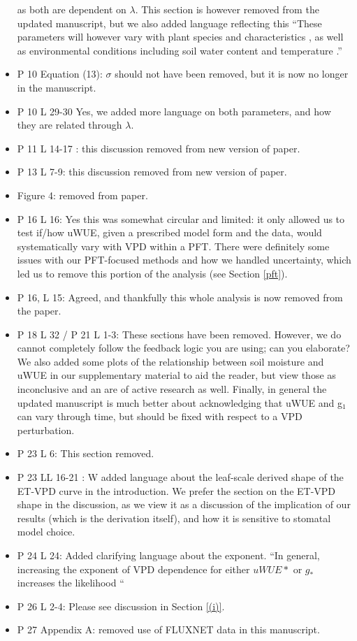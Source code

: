 \documentclass[12pt]{article}
\begin{document}
\begin{itemize}
  as both are dependent on $\lambda$. This section is however removed
  from the updated manuscript, but we also added language reflecting
  this ``These parameters will however vary with plant species
  and characteristics \citep[e.g. wood density, ][]{Lin_2015}, as well
  as environmental conditions including soil water content and
  temperature \citep{Lin_2015, Manzoni2013}.''
\item P 10 Equation (13): $\sigma$ should not have been removed, but
  it is now no longer in the manuscript.
\item P 10 L 29-30 Yes, we added more language on both parameters, and
  how they are related through $\lambda$.
\item P 11 L 14-17 : this discussion removed from new version of
  paper.
\item P 13 L 7-9: this discussion removed from new version of paper.
\item Figure 4: removed from paper.
\item P 16 L 16: Yes this was somewhat circular and limited: it only
  allowed us to test if/how uWUE, given a prescribed model form
  and the data, would systematically vary with VPD within a PFT. There
  were definitely some issues with our PFT-focused methods and how we
  handled uncertainty, which led us to remove this portion of the
  analysis (see Section \ref{pft}).
\item P 16, L 15: Agreed, and thankfully this whole analysis is now
  removed from the paper.
\item P 18 L 32 / P 21 L 1-3: These sections have been
  removed. However, we do cannot completely follow the feedback logic
  you are using; can you elaborate? We also added some plots of the
  relationship between soil moisture and uWUE in our supplementary
  material to aid the reader, but view those as inconclusive and an
  are of active research as well. Finally, in general the updated  manuscript is
  much better about acknowledging that uWUE and g$_1$ can vary through
  time, but should be fixed with respect to a VPD perturbation.
\item P 23 L 6: This section removed.
\item P 23 LL 16-21 : W added language about the leaf-scale derived
  shape of the ET-VPD curve in the introduction. We prefer the section
  on the ET-VPD shape in the discussion, as we view it as a discussion
  of the implication of our results (which is the derivation itself),
  and how it is sensitive to stomatal model choice.
\item P 24 L 24: Added clarifying language about the exponent.
  ``In general, increasing the exponent of VPD dependence for
  either $uWUE*$ or $g_*$ increases the likelihood ``
\item P 26 L 2-4: Please see discussion in Section \ref{(i)}.
\item P 27 Appendix A: removed use of FLUXNET data in this manuscript.
\end{itemize}
\end{document}
